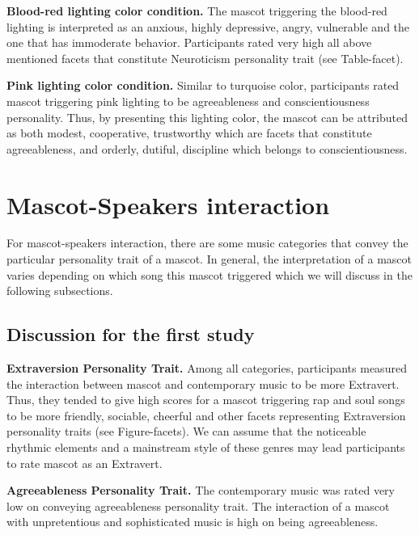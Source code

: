 \par\textbf{Blood-red lighting color condition.}
The mascot triggering the blood-red lighting is interpreted as an anxious,
highly depressive, angry, vulnerable and the one that has immoderate behavior.
Participants rated very high all above mentioned facets that constitute Neuroticism personality trait (see Table-facet).

\par\textbf{Pink lighting color condition.}
Similar to turquoise color, participants rated mascot triggering pink lighting to be
agreeableness and conscientiousness personality.
Thus, by presenting this lighting color, the mascot can be attributed as both modest, cooperative, trustworthy
which are facets that constitute agreeableness, and orderly, dutiful, discipline which belongs to conscientiousness.

\section{Mascot-Speakers interaction}
\label{sec:mascot-speakers-interaction}
For mascot-speakers interaction, there are some music categories that convey the particular personality trait of a mascot.
In general, the interpretation of a mascot varies depending on which song this mascot triggered
which we will discuss in the following subsections.


\subsection{Discussion for the first study}
\label{subsec:discussion-for-the-first-study4}

\par\textbf{Extraversion Personality Trait.}
Among all categories, participants measured the interaction between mascot and contemporary music
to be more Extravert.
Thus, they tended to give high scores for a mascot triggering rap and soul songs
to be more friendly, sociable, cheerful and other facets representing Extraversion personality traits (see Figure-facets).
We can assume that the noticeable rhythmic elements and a mainstream style of these genres
may lead participants to rate mascot as an Extravert.

\par\textbf{Agreeableness Personality Trait.}
The contemporary music was rated very low on conveying agreeableness personality trait.
The interaction of a mascot with unpretentious and sophisticated music is high on being agreeableness.

